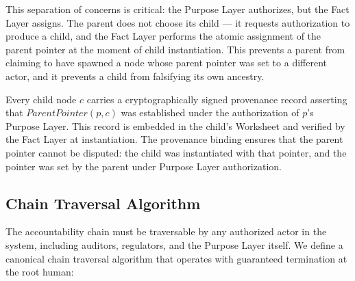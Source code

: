 This separation of concerns is critical: the Purpose Layer authorizes, but the Fact Layer assigns. The parent does not choose its child — it requests authorization to produce a child, and the Fact Layer performs the atomic assignment of the parent pointer at the moment of child instantiation. This prevents a parent from claiming to have spawned a node whose parent pointer was set to a different actor, and it prevents a child from falsifying its own ancestry.

\begin{property}
Every child node $c$ carries a cryptographically signed provenance record asserting that $\textit{ParentPointer}(p, c)$ was established under the authorization of $p$'s Purpose Layer. This record is embedded in the child's Worksheet and verified by the Fact Layer at instantiation. The provenance binding ensures that the parent pointer cannot be disputed: the child was instantiated with that pointer, and the pointer was set by the parent under Purpose Layer authorization.
\end{property}

\subsection{Chain Traversal Algorithm}

The accountability chain must be traversable by any authorized actor in the system, including auditors, regulators, and the Purpose Layer itself. We define a canonical chain traversal algorithm that operates with guaranteed termination at the root human:

